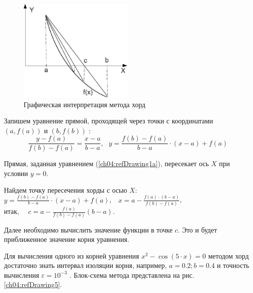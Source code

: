 \begin{figure}[htb]
\begin{center}
\includegraphics[width=0.5\textwidth]{img/ris_4_5}
\caption{Графическая интерпретация метода хорд}
\label{ch04:refDrawing4}
\end{center}
\end{figure}

Запишем уравнение прямой, проходящей через точки с координатами   $(a,f(a))$  и  $(b,f(b))$ :
\begin{equation}\label{ch04:refDrawing1a}
\frac{y-f(a)}{f(b)-f(a)}=\frac{x-a}{b-a},\ \ \  y=\frac{f(b)-f(a)}{b-a}\cdot (x-a)+f(a)
\end{equation}

Прямая, заданная уравнением (\ref{ch04:refDrawing1a}), пересекает ось $X$ при условии $y=0$.

Найдем точку пересечения хорды с осью $X$:\\
${y=\frac{f(b)-f(a)}{b-a}\cdot (x-a)+f(a)}$,\ \  ${x=a-\frac{f(a)\cdot (b-a)}{f(b)-f(a)}}$,\\ 
итак, \ \  ${c=a-\frac{f(a)}{f(b)-f(a)}(b-a)}$.

Далее необходимо вычислить значение функции в точке $c$. Это и будет приближенное значение корня
уравнения.

Для вычисления одного из корней уравнения  $x^2-\cos (5\cdot x)=0$  методом хорд достаточно знать интервал изоляции
корня, например,  $a=0.2;b=0.4$  и точность вычисления  $\varepsilon=10^{-3}$ . Блок-схема метода представлена на рис.
\ref{ch04:refDrawing5}. 

